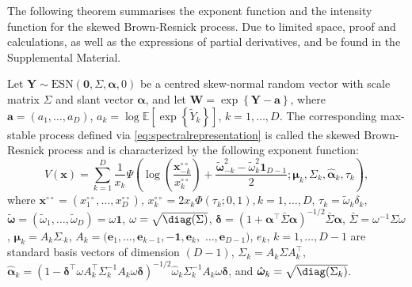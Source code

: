 \documentclass[12pt]{article}
\begin{document}
The following theorem summarises the exponent function and the intensity function for the skewed Brown-Resnick process. Due to limited space, 
proof and calculations, as well as the expressions of partial derivatives, and be found in the Supplemental Material. 

\begin{theorem}
\label{thm:skewBR}
Let $\bm Y \sim \text{ESN}(\bm 0,\Sigma,\bm\alpha,0)$ be a centred skew-normal random vector with scale matrix $\Sigma$ and slant vector $\bm \alpha$, and let $\bm W = \exp\left\{ \bm Y - \bm a \right\}$, where $\bm a = (a_1, \ldots, a_D)$, $a_k=\log \mathbb E\left[\exp\left\{\tilde Y_k \right\}\right]$, $k=1, \ldots, D$. The corresponding max-stable process defined via \eqref{eq:spectralrepresentation} is called the skewed Brown-Resnick process and is characterized by the following exponent function:
%
\begin{equation}
\label{eq:V_skBR}
V(\bm x) =\sum_{k=1}^D \frac{1}{x_k} 
\Psi \left(\log \left( \frac{\bm x^{\circ\circ}_{-k}}{x^{\circ\circ}_k} \right) + \frac{\tilde{\bm \omega}_{-k}^2 - \tilde{\omega}_k^2 \bm 1_{D-1}}{2} ; \bm \mu_k, \Sigma_k, \hat{\bm \alpha}_k, \tau_k \right),
\end{equation}
%
where 
$\bm x^{\circ\circ} = \left( x^{\circ\circ}_1, \ldots, x^{\circ\circ}_D\right)$, 
$x^{\circ\circ}_k = 2x_k \Phi\left( \tau_k; 0, 1 \right), k=1, \ldots, D$, 
$\tau_k = \tilde{\omega}_k \delta_k$, $\tilde{\bm \omega} = \left( \tilde{\omega}_1, \ldots, \tilde{ \omega}_D\right) = \omega \bm 1$, $\omega = \sqrt{\diag(\Sigma)}$, 
$\bm \delta = \left( 1 + \bm \alpha^\top \bar{\Sigma} \bm \alpha\right)^{-1/2}\bar{\Sigma} \bm \alpha$, 
$\bar{\Sigma} = \omega^{-1} \Sigma \omega$,
$\bm\mu_k = A_k \Sigma_{\cdot k}$, 
$A_k = (\bm e_1, \ldots,\bm e_{k-1}, -\bm 1,\bm e_{k},$ $\ldots,\bm e_{D-1})$, 
$e_k$, $k=1, \ldots, D-1$ are standard basis vectors of dimension $(D-1)$, 
$\Sigma_k = A_k \Sigma A_k^\top$, 
$\hat{\bm\alpha}_k = \left(1-\bm\delta^\top \omega A_k^\top\Sigma_k^{-1} A_k \omega\bm\delta \right)^{-1/2} \hat{ \omega}_k\Sigma_k^{-1}A_k \omega\bm\delta$, 
and $\hat{\bm \omega}_k = \sqrt{\diag(\Sigma_k)}$.
\end{theorem}
\end{document}
